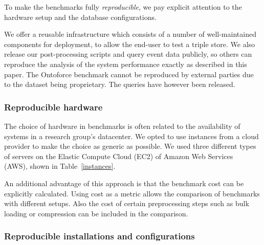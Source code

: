 To make the benchmarks fully \emph{reproducible}, we pay explicit attention to the hardware setup and the database configurations. 

We offer a reusable infrastructure which consists of a number of well-maintained components for deployment, 
to allow the end-user to test a triple store. 
We also release our post-processing scripts and query event data publicly, so others can reproduce the analysis of the system performance exactly as described in this paper. 
The Ontoforce benchmark cannot be reproduced by external parties due to the dataset being proprietary. The queries have however been released.

\subsubsection{Reproducible hardware}
The choice of hardware in benchmarks is often related to the availability of systems in a research group's datacenter.
We opted to use instances from a cloud provider to make the choice as generic as possible. 
We used three different types of servers on the Elastic Compute Cloud (EC2) of Amazon Web Services~\cite{ec2} (AWS), shown in Table~\ref{instances}. 

\begin{table}[ht!]
	\centering
	\caption{Instance types used in benchmarks and their purpose.}
	\label{instances}
\end{table}

An additional advantage of this approach is that the benchmark cost can be explicitly calculated. Using cost as a metric allows the comparison of benchmarks with different setups. Also the cost of certain preprocessing steps such as bulk loading or compression can be included in the comparison.

\subsubsection{Reproducible installations and configurations}

